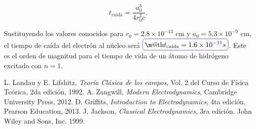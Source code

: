\documentclass[a4paper,11pt]{article}
\makeatletter
\numberwithin{equation}{section}
\newcommand*{\boxcolor}{blue}
\renewcommand{\boxed}[1]{\textcolor{\boxcolor}{%
\tikz[baseline={([yshift=-1ex]current bounding box.center)}] \node [rectangle, minimum width=1ex,rounded corners,draw] {\normalcolor\m@th$\displaystyle#1$};}}
\makeatother
\begin{document}
\begin{equation}
 t_{\text{caída}} = \frac{a_0^3}{4r_0^2c}.
\end{equation}

Sustituyendo los valores conocidos para $r_0 = 2.8 \times 10^{-13}$ cm y 
$a_0 = 5.3 \times 10^{-9}$ cm, el tiempo de caída del electrón al núcleo será 
$\boxed{t_{\text{caída}} = 1.6 \times 10^{-11} s}$. Este es el orden de magnitud para el tiempo de 
vida de un átomo de hidrógeno excitado con $n=1$.

\begin{thebibliography}{10}
L. Landau y E. Lifshitz, \emph{Teoría Clásica de los campos}, Vol. 2 del Curso de 
Física Teórica, 2da edición, 1992.
 A. Zangwill, \emph{Modern Electrodynamics}, Cambridge University Press, 2012.
 D. Griffits, \emph{Introduction to Electrodynamics}, 4ta edición, Pearson Education, 
 2013.
J. Jackson, \emph{Classical Electrodynamics}, 3ra edición. John Wiley and Sons, Inc. 
1999.
\end{thebibliography}
\end{document}

